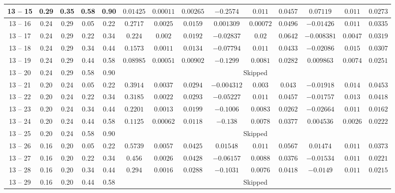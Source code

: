 \begin{longtable}{|*{14}{c|}}
\hline
13 -- 15 & 0.29 & 0.35 & 0.58 & 0.90 & $0.01425$ & $0.00011$ & $0.00265$ & $-0.2574$ & $0.011$ & $0.0457$ & $0.07119$ & $0.011$ & $0.0273$ \\
\hline
13 -- 16 & 0.24 & 0.29 & 0.05 & 0.22 & $0.2717$ & $0.0025$ & $0.0159$ & $0.001309$ & $0.00072$ & $0.0496$ & $-0.01426$ & $0.011$ & $0.0335$ \\
\hline
13 -- 17 & 0.24 & 0.29 & 0.22 & 0.34 & $0.224$ & $0.002$ & $0.0192$ & $-0.02837$ & $0.02$ & $0.0642$ & $-0.008381$ & $0.0047$ & $0.0319$ \\
\hline
13 -- 18 & 0.24 & 0.29 & 0.34 & 0.44 & $0.1573$ & $0.0011$ & $0.0134$ & $-0.07794$ & $0.011$ & $0.0433$ & $-0.02086$ & $0.015$ & $0.0307$ \\
\hline
13 -- 19 & 0.24 & 0.29 & 0.44 & 0.58 & $0.08985$ & $0.00051$ & $0.00902$ & $-0.1299$ & $0.0081$ & $0.0282$ & $0.009863$ & $0.0074$ & $0.0251$ \\
\hline
13 -- 20 & 0.24 & 0.29 & 0.58 & 0.90 & \multicolumn{9}{c|}{Skipped} \\
\hline
13 -- 21 & 0.20 & 0.24 & 0.05 & 0.22 & $0.3914$ & $0.0037$ & $0.0294$ & $-0.004312$ & $0.003$ & $0.043$ & $-0.01918$ & $0.014$ & $0.0453$ \\
\hline
13 -- 22 & 0.20 & 0.24 & 0.22 & 0.34 & $0.3185$ & $0.0022$ & $0.0293$ & $-0.05227$ & $0.011$ & $0.0457$ & $-0.01757$ & $0.013$ & $0.0418$ \\
\hline
13 -- 23 & 0.20 & 0.24 & 0.34 & 0.44 & $0.2201$ & $0.0013$ & $0.0199$ & $-0.1006$ & $0.0083$ & $0.0262$ & $-0.02664$ & $0.011$ & $0.0162$ \\
\hline
13 -- 24 & 0.20 & 0.24 & 0.44 & 0.58 & $0.1125$ & $0.00062$ & $0.0118$ & $-0.138$ & $0.0078$ & $0.0377$ & $0.004536$ & $0.0026$ & $0.0222$ \\
\hline
13 -- 25 & 0.20 & 0.24 & 0.58 & 0.90 & \multicolumn{9}{c|}{Skipped} \\
\hline
13 -- 26 & 0.16 & 0.20 & 0.05 & 0.22 & $0.5739$ & $0.0057$ & $0.0425$ & $0.01548$ & $0.011$ & $0.0567$ & $0.01474$ & $0.011$ & $0.0373$ \\
\hline
13 -- 27 & 0.16 & 0.20 & 0.22 & 0.34 & $0.456$ & $0.0026$ & $0.0428$ & $-0.06157$ & $0.0088$ & $0.0376$ & $-0.01534$ & $0.011$ & $0.0221$ \\
\hline
13 -- 28 & 0.16 & 0.20 & 0.34 & 0.44 & $0.294$ & $0.0016$ & $0.0288$ & $-0.1031$ & $0.0076$ & $0.0418$ & $-0.0149$ & $0.011$ & $0.0215$ \\
\hline
13 -- 29 & 0.16 & 0.20 & 0.44 & 0.58 & \multicolumn{9}{c|}{Skipped} \\

\end{longtable}
